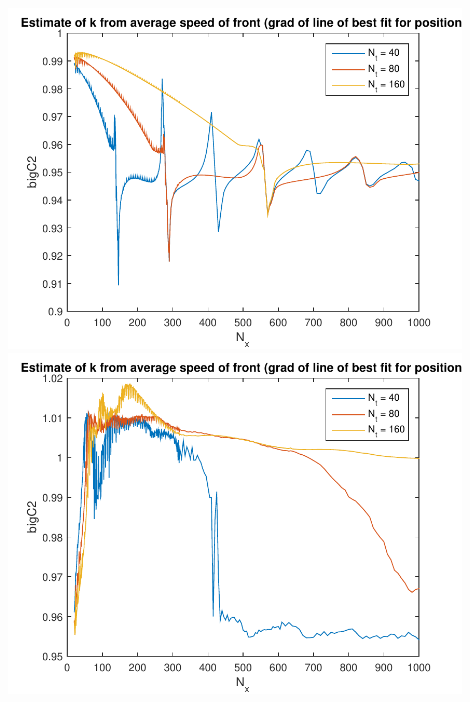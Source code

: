 \documentclass{article}
\begin{document}
\includegraphics[width=0.9\textwidth]{alan6-k.pdf}\\
\includegraphics[width=0.9\textwidth]{alan7-k.pdf}
\end{document}
